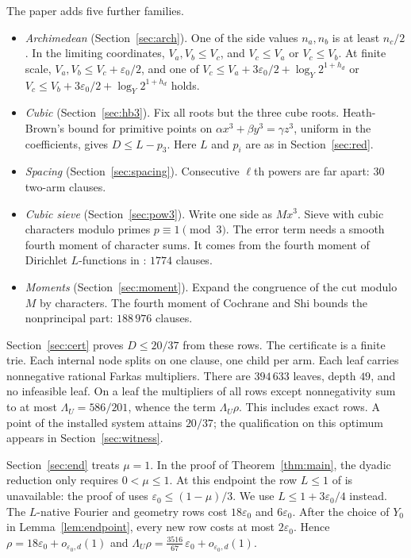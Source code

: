 \documentclass{amsart}
\theoremstyle{definition}
\theoremstyle{plain}
\numberwithin{equation}{section}
\numberwithin{table}{section}
\newcommand{\certLeaves}{394\,633}
\newcommand{\certDepth}{49}
\newcommand{\certLambda}{586/201}
\newcommand{\certLambdaRho}{\frac{3516}{67}}
\begin{document}
The paper adds five further families.
\begin{itemize}
\item \emph{Archimedean} (Section~\ref{sec:arch}). One of the side values
 $n_a,n_b$ is at least $n_c/2$. In the limiting coordinates, $V_a,V_b\le V_c$, and
 $V_c\le V_a$ or $V_c\le V_b$. At finite scale,
 $V_a,V_b\le V_c+\varepsilon_0/2$, and one of
 $V_c\le V_a+3\varepsilon_0/2+\log_Y2^{1+h_d}$ or
 $V_c\le V_b+3\varepsilon_0/2+\log_Y2^{1+h_d}$ holds.
\item \emph{Cubic} (Section~\ref{sec:hb3}). Fix all roots but the three
 cube roots. Heath-Brown's bound \cite[Theorem~1.3]{HBcube} for primitive
 points on $\alpha x^3+\beta y^3=\gamma z^3$, uniform in the coefficients,
 gives $D\le L-p_3$. Here $L$ and $p_i$ are as in Section~\ref{sec:red}.
\item \emph{Spacing} (Section~\ref{sec:spacing}). Consecutive $\ell$th powers
 are far apart: $30$ two-arm clauses.
\item \emph{Cubic sieve} (Section~\ref{sec:pow3}). Write one side as
 $Mx^3$. Sieve with cubic characters modulo primes $p\equiv1\pmod3$. The
 error term needs a smooth fourth moment of character sums. It comes from the
 fourth moment of Dirichlet $L$-functions in \cite[Lemma~4]{GMRR}: $1774$ clauses.
\item \emph{Moments} (Section~\ref{sec:moment}). Expand the congruence of
 the cut modulo $M$ by characters. The fourth moment of Cochrane and Shi
 \cite[Theorem~1]{CS} bounds the nonprincipal part: $188\,976$ clauses.
\end{itemize}

Section~\ref{sec:cert} proves $D\le20/37$ from these rows. The certificate is
a finite trie. Each internal node splits on one clause, one child per arm.
Each leaf carries nonnegative rational Farkas multipliers. There are
$\certLeaves$ leaves, depth $\certDepth$, and no infeasible leaf. On a leaf
the multipliers of all rows except nonnegativity sum to at most
$\Lambda_U=\certLambda$, whence the term $\Lambda_U\rho$. This includes exact
rows. A point of the
installed system attains $20/37$; the qualification on this optimum appears in
Section~\ref{sec:witness}.

Section~\ref{sec:end} treats $\mu=1$. In the proof of Theorem~\ref{thm:main},
the dyadic reduction only requires $0<\mu\le1$. At this endpoint the row
$L\le1$ of \cite{BBLT} is unavailable: the proof of
\cite[Theorem~1.3]{BBLT} uses $\varepsilon_0\le(1-\mu)/3$. We use
$L\le1+3\varepsilon_0/4$ instead. The $L$-native Fourier and geometry rows cost
$18\varepsilon_0$ and $6\varepsilon_0$. After the choice of $Y_0$ in
Lemma~\ref{lem:endpoint}, every new row costs at most $2\varepsilon_0$.
Hence $\rho=18\varepsilon_0+o_{\varepsilon_0,d}(1)$ and
$\Lambda_U\rho=\certLambdaRho\,\varepsilon_0+o_{\varepsilon_0,d}(1)$.
\end{document}
